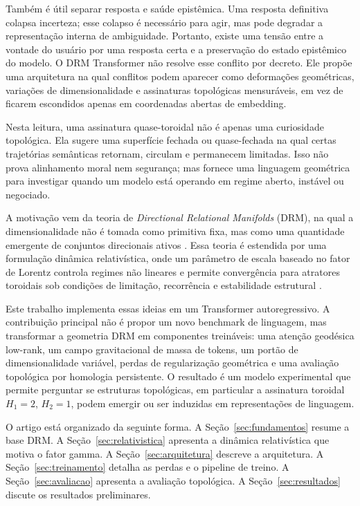 Também é útil separar resposta e saúde epistêmica. Uma resposta definitiva
colapsa incerteza; esse colapso é necessário para agir, mas pode degradar a
representação interna de ambiguidade. Portanto, existe uma tensão entre a
vontade do usuário por uma resposta certa e a preservação do estado epistêmico
do modelo. O DRM Transformer não resolve esse conflito por decreto. Ele propõe
uma arquitetura na qual conflitos podem aparecer como deformações geométricas,
variações de dimensionalidade e assinaturas topológicas mensuráveis, em vez de
ficarem escondidos apenas em coordenadas abertas de embedding.

Nesta leitura, uma assinatura quase-toroidal não é apenas uma curiosidade
topológica. Ela sugere uma superfície fechada ou quase-fechada na qual certas
trajetórias semânticas retornam, circulam e permanecem limitadas. Isso não
prova alinhamento moral nem segurança; mas fornece uma linguagem geométrica
para investigar quando um modelo está operando em regime aberto, instável ou
negociado.

A motivação vem da teoria de \emph{Directional Relational Manifolds} (DRM),
na qual a dimensionalidade não é tomada como primitiva fixa, mas como uma
quantidade emergente de conjuntos direcionais ativos \cite{muniz_drm_v11}. Essa
teoria é estendida por uma formulação dinâmica relativística, onde um parâmetro
de escala baseado no fator de Lorentz controla regimes não lineares e permite
convergência para atratores toroidais sob condições de limitação, recorrência e
estabilidade estrutural \cite{muniz_relativistic_drm}.

Este trabalho implementa essas ideias em um Transformer autoregressivo. A
contribuição principal não é propor um novo benchmark de linguagem, mas
transformar a geometria DRM em componentes treináveis: uma atenção geodésica
low-rank, um campo gravitacional de massa de tokens, um portão de
dimensionalidade variável, perdas de regularização geométrica e uma avaliação
topológica por homologia persistente. O resultado é um modelo experimental que
permite perguntar se estruturas topológicas, em particular a assinatura
toroidal $H_1=2$, $H_2=1$, podem emergir ou ser induzidas em representações de
linguagem.

O artigo está organizado da seguinte forma. A Seção~\ref{sec:fundamentos}
resume a base DRM. A Seção~\ref{sec:relativistica} apresenta a dinâmica
relativística que motiva o fator gamma. A Seção~\ref{sec:arquitetura} descreve
a arquitetura. A Seção~\ref{sec:treinamento} detalha as perdas e o pipeline de
treino. A Seção~\ref{sec:avaliacao} apresenta a avaliação topológica. A
Seção~\ref{sec:resultados} discute os resultados preliminares.
